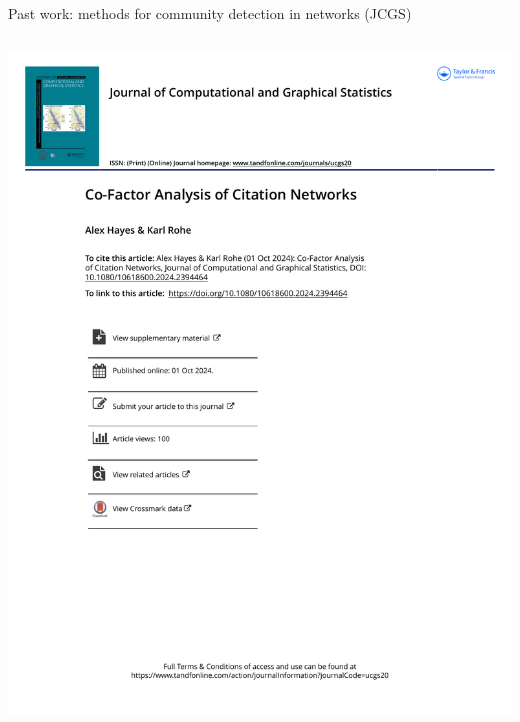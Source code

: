 \documentclass[aspectratio=169]{beamer}
\theoremstyle{remark}
\begin{document}
\begin{frame}{Past work: methods for community detection in networks (JCGS)}
\begin{columns}
\begin{column}{0.5\textwidth}
            \includegraphics[width=1\textwidth, page=2, trim={1cm 15cm 5.3cm 0}, clip]{./papers/citations.pdf}
        \end{column}
    \end{columns}
\end{frame}
\end{document}
